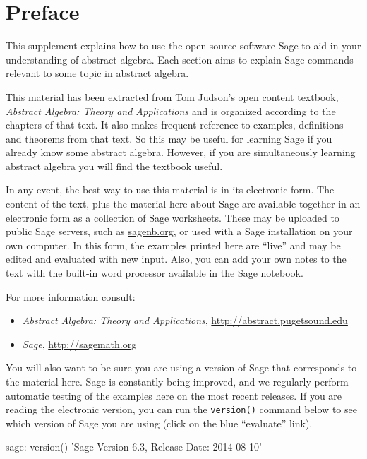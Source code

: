 \documentclass[12pt,oneside]{book}
\begin{document}
\chapter*{Preface}
This supplement explains how to use the open source software Sage to aid in your understanding of abstract algebra.  Each section aims to explain Sage commands relevant to some topic in abstract algebra.\par
%
This material has been extracted from Tom Judson's open content textbook, {\sl Abstract Algebra: Theory and Applications} and is organized according to the chapters of that text.  It also makes frequent reference to examples, definitions and theorems from that text.  So this may be useful for learning Sage if you already know some abstract algebra.  However, if you are simultaneously learning abstract algebra you will find the textbook useful.\par
%
In any event, the best way to use this material is in its electronic form.  The content of the text, plus the material here about Sage are available together in an electronic form as a collection of Sage worksheets.  These may be uploaded to public Sage servers, such as \url{sagenb.org}, or used with a Sage installation on your own computer.  In this form, the examples printed here are ``live'' and may be edited and evaluated with new input.  Also, you can add your own notes to the text with the built-in word processor available in the Sage notebook.\par
%
For more information consult:
%
\begin{itemize}
%
\item {\sl Abstract Algebra: Theory and Applications}, \url{http://abstract.pugetsound.edu}
%
\item {\sl Sage}, \url{http://sagemath.org}
%
\end{itemize}
%
You will also want to be sure you are using a version of Sage that corresponds to the material here.  Sage is constantly being improved, and we regularly perform automatic testing of the examples here on the most recent releases.  If you are reading the electronic version, you can run the \verb?version()? command below to see which version of Sage you are using (click on the blue ``evaluate'' link).
%
\begin{sageverbatim}
sage: version()
'Sage Version 6.3, Release Date: 2014-08-10'
\end{sageverbatim}
%
\begin{sageverbatim}
\end{sageverbatim}
\end{document}
